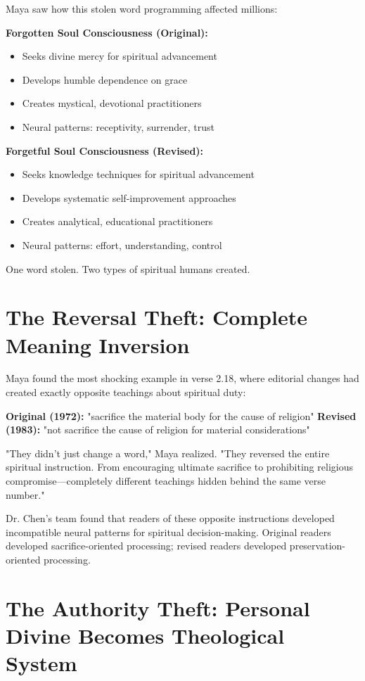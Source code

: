 \documentclass[11pt,twoside]{book}
\begin{document}
Maya saw how this stolen word programming affected millions:

\textbf{\textbf{Forgotten Soul Consciousness (Original):}}
\begin{itemize}
\item Seeks divine mercy for spiritual advancement
\item Develops humble dependence on grace
\item Creates mystical, devotional practitioners
\item Neural patterns: receptivity, surrender, trust
\end{itemize}

\textbf{\textbf{Forgetful Soul Consciousness (Revised):}}
\begin{itemize}
\item Seeks knowledge techniques for spiritual advancement
\item Develops systematic self-improvement approaches
\item Creates analytical, educational practitioners
\item Neural patterns: effort, understanding, control
\end{itemize}

One word stolen. Two types of spiritual humans created.
\section*{The Reversal Theft: Complete Meaning Inversion}
\label{sec:org0424171}

Maya found the most shocking example in verse 2.18, where editorial changes had created exactly opposite teachings about spiritual duty:

\textbf{\textbf{Original (1972):}} "sacrifice the material body for the cause of religion"
\textbf{\textbf{Revised (1983):}} "not sacrifice the cause of religion for material considerations"

"They didn't just change a word," Maya realized. "They reversed the entire spiritual instruction. From encouraging ultimate sacrifice to prohibiting religious compromise—completely different teachings hidden behind the same verse number."

Dr. Chen's team found that readers of these opposite instructions developed incompatible neural patterns for spiritual decision-making. Original readers developed sacrifice-oriented processing; revised readers developed preservation-oriented processing.
\section*{The Authority Theft: Personal Divine Becomes Theological System}
\label{sec:org1c71d88}
\end{document}
